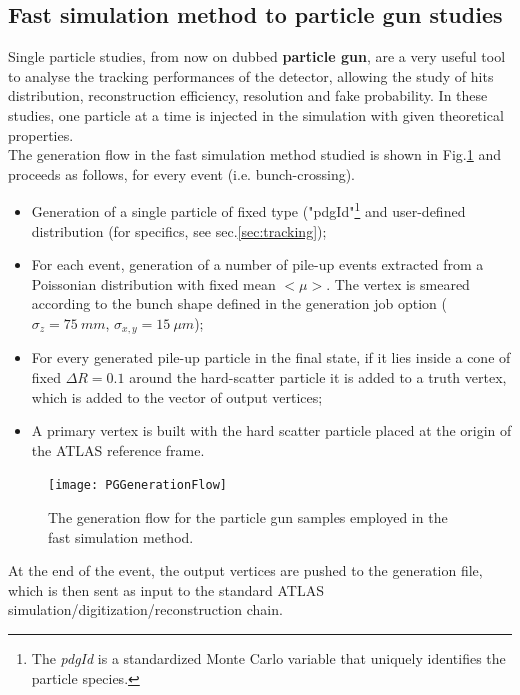 \documentclass[a4paper,twoside,12pt]{article}
\begin{document}
\subsection{Fast simulation method to particle gun studies}\label{sec:simulation:pg}

Single particle studies, from now on dubbed \textbf{particle gun}, are a very useful tool to analyse the tracking performances of the
detector, allowing the study of hits distribution, reconstruction efficiency, resolution and
fake probability. In these studies, one particle at a time is injected in the simulation with given theoretical properties.\\

The generation flow in the fast simulation method studied is shown in Fig.\ref{fig:PGGenerationFlow} and proceeds as follows,
for every event (i.e. bunch-crossing).\\
\begin{itemize}
\item Generation of a single particle of fixed type ("pdgId"\footnote{The \textit{pdgId} 
is a standardized Monte Carlo variable that uniquely identifies the particle species.} and 
user-defined distribution (for specifics, see sec.\ref{sec:tracking});
\item For each event, generation of a number of pile-up events extracted from a Poissonian
distribution with fixed mean $<\mu>$. The vertex is smeared according to the bunch shape
defined in the generation job option ($\sigma_{z} = 75\ mm$, $\sigma_{x,y} = 15\ \mu m$);
\item For every generated pile-up particle in the final state, if it lies inside a cone of fixed
$\Delta R = 0.1$ around the hard-scatter particle it is added to a truth vertex, which is added to the vector of output vertices;
\item A primary vertex is built with the hard scatter particle placed at the origin of the
ATLAS reference frame.
\end{itemize}

\begin{figure} [h]
	\texttt{[image: PGGenerationFlow]}
	\caption{The generation flow for the particle gun samples employed in the fast 
	simulation method. }
	\label{fig:PGGenerationFlow}
\end{figure}

At the end of the event, the output vertices are pushed to the generation file, which is then
sent as input to the standard ATLAS simulation/digitization/reconstruction chain.\\
\end{document}
